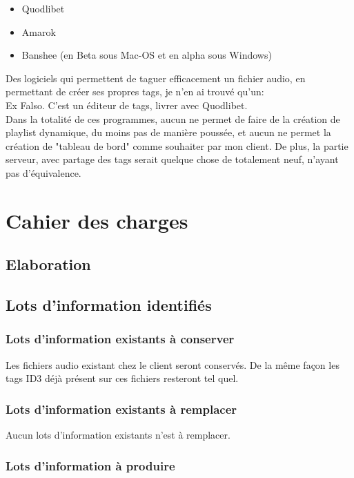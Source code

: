 \documentclass[a4paper,12pt]{report}
\begin{document}
\begin{itemize}
\item Quodlibet
\item Amarok
\item Banshee (en Beta sous Mac-OS et en alpha sous Windows)
\end{itemize}

Des logiciels qui permettent de taguer efficacement un fichier audio, en permettant de créer ses propres tags, je n'en ai trouvé qu'un:\\

Ex Falso.
C'est un éditeur de tags, livrer avec Quodlibet.\\

Dans la totalité de ces programmes, aucun ne permet de faire de la création de playlist dynamique, du moins pas de manière poussée, et aucun ne permet la création de "tableau de bord" comme souhaiter par mon client.
De plus, la partie serveur, avec partage des tags serait quelque chose de totalement neuf, n'ayant pas d'équivalence.

\chapter{Cahier des charges}

\section{Elaboration}


\section{Lots d'information identifiés}

\subsection{Lots d'information existants à conserver}

Les fichiers audio existant chez le client seront conservés. De la même façon les tags ID3 déjà présent sur ces fichiers resteront tel quel. 

\subsection{Lots d'information existants à remplacer}

Aucun lots d'information existants n'est à remplacer.

\subsection{Lots d'information à produire}
 
\end{document}
